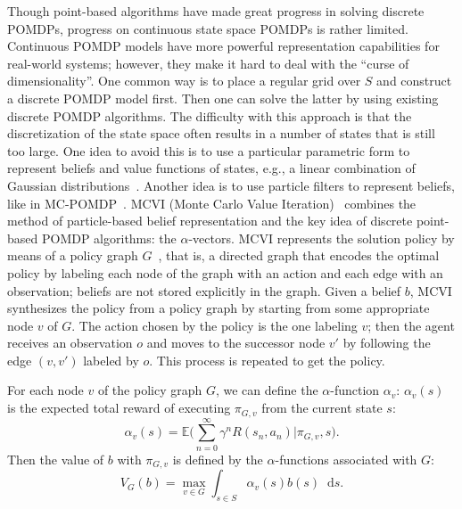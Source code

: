 \documentclass[orivec]{llncs}
\newcommand{\expectation}{\mathbb{E}}
\newcommand{\states}{S}
\newcommand{\reward}{R}
\newcommand{\discount}{\gamma}
\newcommand{\policy}{\pi}
\newcommand{\diff}[1]{\mathop{}\!\mathrm{d}#1}
\begin{document}
Though point-based algorithms have made great progress in solving discrete POMDPs, progress on continuous state space POMDPs is rather limited. 
Continuous POMDP models have more powerful representation capabilities for real-world systems; 
however, they make it hard to deal with the ``curse of dimensionality''. 
One common way is to place a regular grid over $\states$ and construct a discrete POMDP model first. 
Then one can solve the latter by using existing discrete POMDP algorithms. 
The difficulty with this approach is that the discretization of the state space often results in a number of states that is still too large. 
One idea to avoid this is to use a particular parametric form to represent beliefs and value functions of states, e.g., a linear combination of Gaussian distributions~\cite{pbvic}. 
Another idea is to use particle filters to represent beliefs, like in MC-POMDP~\cite{mcpomdp}. 
MCVI (Monte Carlo Value Iteration)~\cite{MCVI} combines the method of particle-based belief representation and the key idea of discrete point-based POMDP algorithms: 
the $\alpha$-vectors. 
MCVI represents the solution policy by means of a policy graph $G$~\cite{MCVI}, that is, a directed graph that encodes the optimal policy by labeling each node of the graph with an action and each edge with an observation;
beliefs are not stored explicitly in the graph.
Given a belief $b$, MCVI synthesizes the policy from a policy graph by starting from some appropriate node $v$ of $G$. 
The action chosen by the policy is the one labeling $v$;
then the agent receives an observation $o$ and moves to the successor node $v'$ by following the edge $(v,v')$ labeled by $o$. 
This process is repeated to get the policy.

For each node $v$ of the policy graph $G$, we can define the $\alpha$-function $\alpha_{v}$: 
$\alpha_{v}(s)$ is the expected total reward of executing $\policy_{G,v}$ from the current state $s$:
\begin{equation}
\label{eq:alphaPolicy}
	\alpha_{v}(s) = \expectation\big(\sum_{n=0}^{\infty} \discount^{n} \reward(s_{n}, a_{n}) | \policy_{G,v}, s\big).
\end{equation}
Then the value of $b$ with $\policy_{G,v}$ is defined by the $\alpha$-functions associated with $G$:
\begin{equation}
	V_{G}(b) = \max_{v \in G} \int_{s\in S} \alpha_{v}(s) b(s) \diff{s}.
\end{equation}
\end{document}
